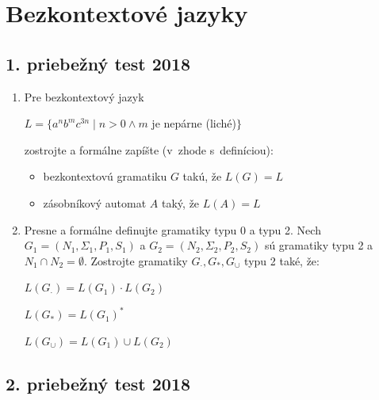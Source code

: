 \documentclass[11pt,a4paper]{article}
\begin{document}
	\section{Bezkontextové jazyky}

		\subsection{1. priebežný test 2018}

		\begin{enumerate}
			\item Pre bezkontextový jazyk
	
			$L = \{a^nb^mc^{3n} \mid n > 0 \land m$ je nepárne (liché)$\}$
	
			zostrojte a formálne zapíšte (v~zhode s~definíciou):
			\begin{itemize}
				\item bezkontextovú gramatiku $G$ takú, že $L(G) = L$
				\item zásobníkový automat $A$ taký, že $L(A) = L$
			\end{itemize}
	
			\item Presne a formálne definujte gramatiky typu 0 a typu 2. Nech $G_1 = (N_1, \Sigma_1, P_1, S_1)$ a $G_2 = (N_2, \Sigma_2, P_2, S_2)$ sú gramatiky typu 2 a $N_1 \cap N_2 = \emptyset$. Zostrojte gramatiky $G_{\cdot}, G_*, G_{\cup}$ typu 2 také, že:
	
			$L(G_{\cdot}) = L(G_1) \cdot L(G_2)$
	
			$L(G_{*}) = L(G_1)^*$
	
			$L(G_{\cup}) = L(G_1) \cup L(G_2)$
		\end{enumerate}

		\subsection{2. priebežný test 2018}
\end{document}

